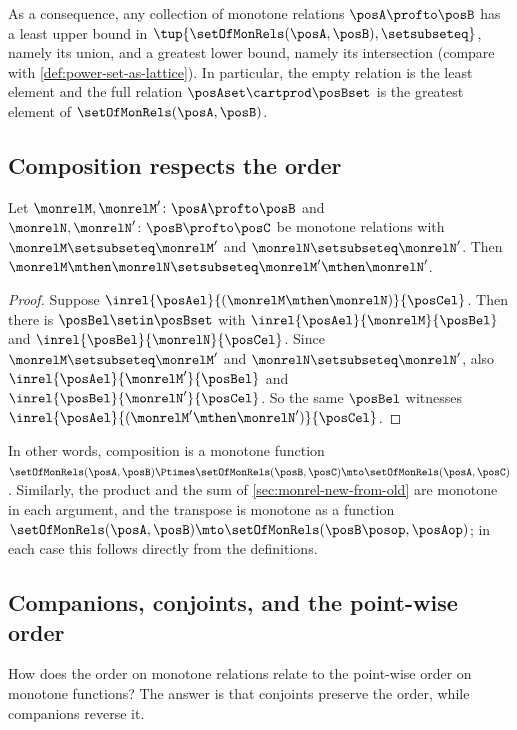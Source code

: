 As a consequence, any collection of monotone relations $\posA \profto \posB$ has a least upper bound in $\tup{\setOfMonRels(\posA, \posB), \setsubseteq}$, namely its union, and a greatest lower bound, namely its intersection (compare with \cref{def:power-set-as-lattice}).
In particular, the empty relation is the least element and the full relation $\posAset \cartprod \posBset$ is the greatest element of $\setOfMonRels(\posA, \posB)$.

\subsection{Composition respects the order}

\begin{lemma}
    \label{lem:monrel-composition-monotone}
    Let $\monrelM, \monrelM' \colon \posA \profto \posB$ and $\monrelN, \monrelN' \colon \posB \profto \posC$ be monotone relations with $\monrelM \setsubseteq \monrelM'$ and $\monrelN \setsubseteq \monrelN'$.
    Then $\monrelM \mthen \monrelN \setsubseteq \monrelM' \mthen \monrelN'$.
\end{lemma}
\begin{proof}
    Suppose $\inrel{\posAel}{(\monrelM \mthen \monrelN)}{\posCel}$.
    Then there is $\posBel \setin \posBset$ with $\inrel{\posAel}{\monrelM}{\posBel}$ and $\inrel{\posBel}{\monrelN}{\posCel}$.
    Since $\monrelM \setsubseteq \monrelM'$ and $\monrelN \setsubseteq \monrelN'$, also $\inrel{\posAel}{\monrelM'}{\posBel}$ and $\inrel{\posBel}{\monrelN'}{\posCel}$.
    So the same $\posBel$ witnesses $\inrel{\posAel}{(\monrelM' \mthen \monrelN')}{\posCel}$.
\end{proof}

In other words, composition is a monotone function $\setOfMonRels(\posA, \posB) \Ptimes \setOfMonRels(\posB, \posC) \mto \setOfMonRels(\posA, \posC)$.
Similarly, the product and the sum of \cref{sec:monrel-new-from-old} are monotone in each argument, and the transpose is monotone as a function $\setOfMonRels(\posA, \posB) \mto \setOfMonRels(\posB\posop, \posAop)$; in each case this follows directly from the definitions.

\subsection{Companions, conjoints, and the point-wise order}

How does the order on monotone relations relate to the point-wise order on monotone functions?
The answer is that conjoints preserve the order, while companions reverse it.

